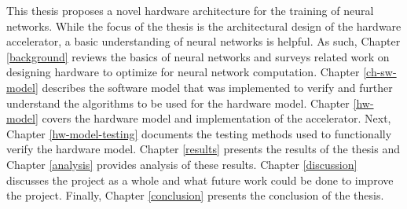 This thesis proposes a novel hardware architecture for the training of neural networks. While the focus of the thesis is the architectural design of the hardware accelerator, a basic understanding of neural networks is helpful. As such, Chapter \ref{background} reviews the basics of neural networks and surveys related work on designing hardware to optimize for neural network computation. Chapter \ref{ch-sw-model} describes the software model that was implemented to verify and further understand the algorithms to be used for the hardware model. Chapter \ref{hw-model} covers the hardware model and implementation of the accelerator. Next, Chapter \ref{hw-model-testing} documents the testing methods used to functionally verify the hardware model. Chapter \ref{results} presents the results of the thesis and Chapter \ref{analysis} provides analysis of these results. Chapter \ref{discussion} discusses the project as a whole and what future work could be done to improve the project. Finally, Chapter \ref{conclusion} presents the conclusion of the thesis.

